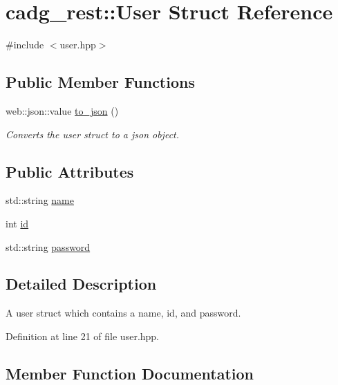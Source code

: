 \hypertarget{structcadg__rest_1_1_user}{}\section{cadg\+\_\+rest\+::User Struct Reference}
\label{structcadg__rest_1_1_user}


{\ttfamily \#include $<$user.\+hpp$>$}

\subsection*{Public Member Functions}
\begin{DoxyCompactItemize}
\item 
web\+::json\+::value \mbox{\hyperlink{structcadg__rest_1_1_user_ad613eb8e3f19134af6415f74594a5d64}{to\+\_\+json}} ()
\begin{DoxyCompactList}\small\item\em Converts the user struct to a json object. \end{DoxyCompactList}\end{DoxyCompactItemize}
\subsection*{Public Attributes}
\begin{DoxyCompactItemize}
\item 
std\+::string \mbox{\hyperlink{structcadg__rest_1_1_user_aaf5fe7f6fdc4d229206f319395548e67}{name}}
\item 
int \mbox{\hyperlink{structcadg__rest_1_1_user_a8807495983130f0fca238fa6ccc8feb5}{id}}
\item 
std\+::string \mbox{\hyperlink{structcadg__rest_1_1_user_af003ad05b0063f7ffcda61fc31ee5523}{password}}
\end{DoxyCompactItemize}


\subsection{Detailed Description}
A user struct which contains a name, id, and password. 

Definition at line 21 of file user.\+hpp.



\subsection{Member Function Documentation}
\mbox{\label{structcadg__rest_1_1_user_ad613eb8e3f19134af6415f74594a5d64}} 
